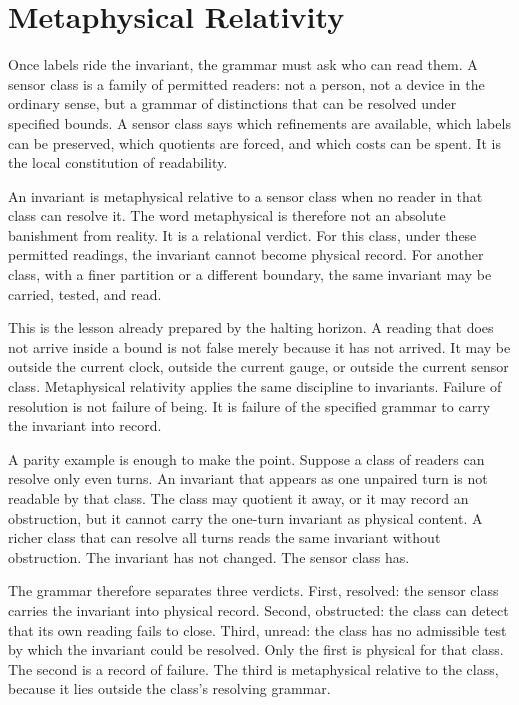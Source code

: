 \section{Metaphysical Relativity}

Once labels ride the invariant, the grammar must ask who can read them. A
sensor class is a family of permitted readers: not a person, not a device in
the ordinary sense, but a grammar of distinctions that can be resolved under
specified bounds. A sensor class says which refinements are available, which
labels can be preserved, which quotients are forced, and which costs can be
spent. It is the local constitution of readability.

An invariant is metaphysical relative to a sensor class when no reader in
that class can resolve it. The word metaphysical is therefore not an
absolute banishment from reality. It is a relational verdict. For this
class, under these permitted readings, the invariant cannot become physical
record. For another class, with a finer partition or a different boundary,
the same invariant may be carried, tested, and read.

This is the lesson already prepared by the halting horizon. A reading that
does not arrive inside a bound is not false merely because it has not
arrived. It may be outside the current clock, outside the current gauge, or
outside the current sensor class. Metaphysical relativity applies the same
discipline to invariants. Failure of resolution is not failure of being. It
is failure of the specified grammar to carry the invariant into record.

A parity example is enough to make the point. Suppose a class of readers can
resolve only even turns. An invariant that appears as one unpaired turn is
not readable by that class. The class may quotient it away, or it may record
an obstruction, but it cannot carry the one-turn invariant as physical
content. A richer class that can resolve all turns reads the same invariant
without obstruction. The invariant has not changed. The sensor class has.

The grammar therefore separates three verdicts. First, resolved: the sensor
class carries the invariant into physical record. Second, obstructed: the
class can detect that its own reading fails to close. Third, unread: the
class has no admissible test by which the invariant could be resolved. Only
the first is physical for that class. The second is a record of failure. The
third is metaphysical relative to the class, because it lies outside the
class's resolving grammar.


